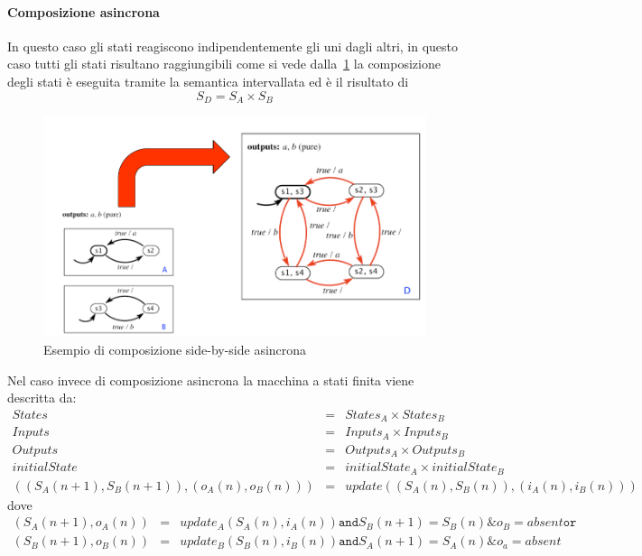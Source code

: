 \paragraph{Composizione asincrona}
In questo caso gli stati reagiscono indipendentemente gli uni dagli altri, in questo caso tutti gli stati risultano raggiungibili come si vede dalla \figurename\,\ref{fig:sideasincrona} la composizione degli stati è eseguita tramite la semantica intervallata ed è il risultato di 
$$S_D=S_A\times S_B$$
\begin{figure}
\centering
\includegraphics[scale=0.4]{img/sideasincrona.png}
\caption{Esempio di composizione side-by-side asincrona}\label{fig:sideasincrona}
\end{figure}
Nel caso invece di composizione asincrona la macchina a stati finita viene descritta da:
$$
\begin{array}{lcl}
States & = & States_A \times States_B\\
Inputs & = & Inputs_A \times Inputs_B\\
Outputs & = & Outputs_A \times Outputs_B\\
initialState & = & initialState_A \times initialState_B\\
((S_A(n+1),S_B(n+1)),(o_A(n),o_B(n))) & = & update((S_A(n),S_B(n)),(i_A(n),i_B(n)))  
\end{array}
$$
dove 
$$
\begin{array}{rcl}
(S_A(n+1),o_A(n)) & = & update_A(S_A(n),i_A(n)) \mathtt{and} S_B(n+1) = S_B(n) \& o_B = absent \mathtt{or}\\
(S_B(n+1),o_B(n)) & = & update_B(S_B(n),i_B(n)) \mathtt{and} S_A(n+1) = S_A(n) \& o_a = absent
\end{array}
$$
